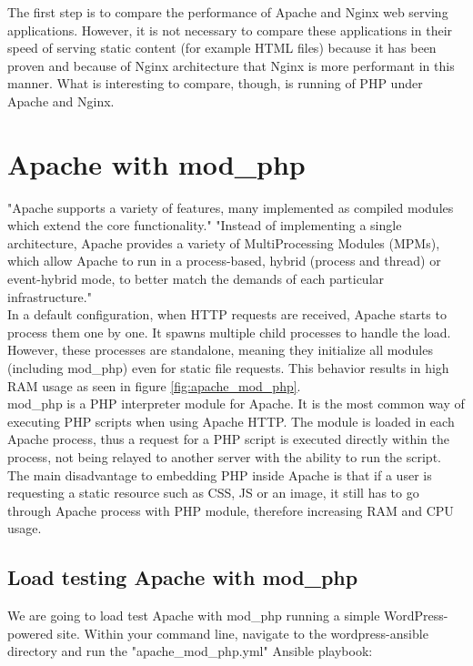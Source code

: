The first step is to compare the performance of Apache and Nginx web serving applications. However, it is not necessary to compare these applications in their speed of serving static content (for example HTML files) because it has been proven and because of Nginx architecture that Nginx is more performant in this manner. What is interesting to compare, though, is running of PHP under Apache and Nginx.

\section{Apache with mod\_php}

"Apache supports a variety of features, many implemented as compiled modules which extend the core functionality." "Instead of implementing a single architecture, Apache provides a variety of MultiProcessing Modules (MPMs), which allow Apache to run in a process-based, hybrid (process and thread) or event-hybrid mode, to better match the demands of each particular infrastructure." \cite{Apache:Wiki}\\

In a default configuration, when HTTP requests are received, Apache starts to process them one by one. It spawns multiple child processes to handle the load. However, these processes are standalone, meaning they initialize all modules (including mod\_php) even for static file requests. This behavior results in high RAM usage as seen in figure \ref{fig:apache_mod_php}. \\

mod\_php is a PHP interpreter module for Apache. It is the most common way of executing PHP scripts when using Apache HTTP. The module is loaded in each Apache process, thus a request for a PHP script is executed directly within the process, not being relayed to another server with the ability to run the script. The main disadvantage to embedding PHP inside Apache is that if a user is requesting a static resource such as CSS, JS or an image, it still has to go through Apache process with PHP module, therefore increasing RAM and CPU usage.

\subsection{Load testing Apache with mod\_php}

We are going to load test Apache with mod\_php running a simple WordPress-powered site. Within your command line, navigate to the wordpress-ansible directory and run the "apache\_mod\_php.yml" Ansible playbook:

